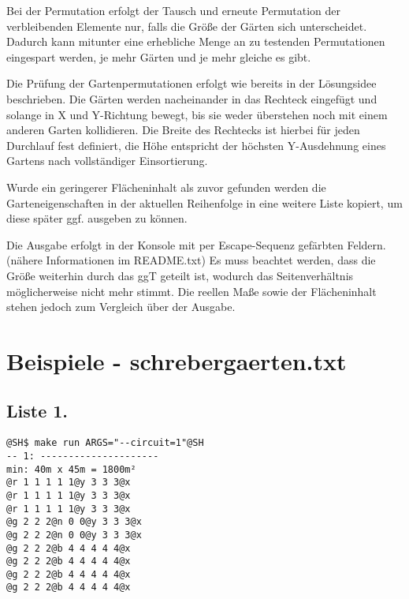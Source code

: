 \documentclass[a4paper,10pt,ngerman]{scrartcl}
\begin{document}
Bei der Permutation erfolgt der Tausch und erneute Permutation der verbleibenden Elemente nur, falls die Größe der Gärten sich unterscheidet. Dadurch kann mitunter eine erhebliche Menge an zu testenden Permutationen eingespart werden, je mehr Gärten und je mehr gleiche es gibt.

Die Prüfung der Gartenpermutationen erfolgt wie bereits in der Lösungsidee beschrieben.
Die Gärten werden nacheinander in das Rechteck eingefügt und solange in X und Y-Richtung bewegt, bis sie weder überstehen noch mit einem anderen Garten kollidieren. Die Breite des Rechtecks ist hierbei für jeden Durchlauf fest definiert, die Höhe entspricht der höchsten Y-Ausdehnung eines Gartens nach vollständiger Einsortierung.

Wurde ein geringerer Flächeninhalt als zuvor gefunden werden die Garteneigenschaften in der aktuellen Reihenfolge in eine weitere Liste kopiert, um diese später ggf. ausgeben zu können.

Die Ausgabe erfolgt in der Konsole mit per Escape-Sequenz gefärbten Feldern. (nähere Informationen im README.txt) Es muss beachtet werden, dass die Größe weiterhin durch das ggT geteilt ist, wodurch das Seitenverhältnis möglicherweise nicht mehr stimmt. Die reellen Maße sowie der Flächeninhalt stehen jedoch zum Vergleich über der Ausgabe.


\pagebreak
\section[Beispiele]{Beispiele - schrebergaerten.txt}

\subsection{Liste 1.}
\begin{lstlisting}
@SH$ make run ARGS="--circuit=1"@SH
-- 1: ---------------------
min: 40m x 45m = 1800m²
@r 1 1 1 1 1@y 3 3 3@x
@r 1 1 1 1 1@y 3 3 3@x
@r 1 1 1 1 1@y 3 3 3@x
@g 2 2 2@n 0 0@y 3 3 3@x
@g 2 2 2@n 0 0@y 3 3 3@x
@g 2 2 2@b 4 4 4 4 4@x
@g 2 2 2@b 4 4 4 4 4@x
@g 2 2 2@b 4 4 4 4 4@x
@g 2 2 2@b 4 4 4 4 4@x
\end{lstlisting}
\end{document}
